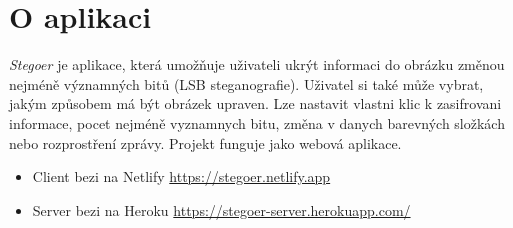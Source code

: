 
\section{O aplikaci}\label{sec:o-aplikaci}

\emph{Stegoer} je aplikace, která umožňuje uživateli ukrýt informaci do obrázku
změnou nejméně významných bitů (LSB steganografie).
Uživatel si také může vybrat, jakým způsobem má být obrázek upraven.
Lze nastavit vlastni klic k zasifrovani informace,
pocet nejméně vyznamnych bitu, změna v danych barevných složkách nebo
rozprostření zprávy.
Projekt funguje jako webová aplikace.

\begin{itemize}
    \item Client bezi na Netlify \url{https://stegoer.netlify.app}
    \item Server bezi na Heroku \url{https://stegoer-server.herokuapp.com/}
\end{itemize}
